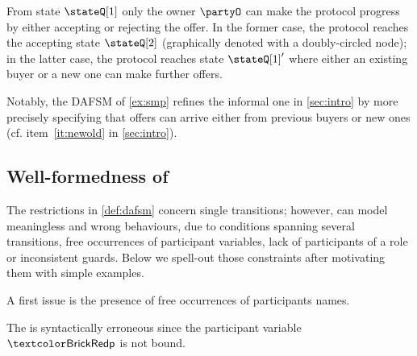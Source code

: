 \begin{example}
  From state $\stateQ[1]$ only the owner $\partyO$ can make the protocol progress by either accepting or rejecting the offer.
  In the former case, the protocol reaches the accepting state
  $\stateQ[2]$ (graphically denoted with a doubly-circled node); in
  the latter case, the protocol reaches state $\stateQ[1]'$ where
  either an existing buyer or a new one can make further offers.
  \finex
\end{example}
Notably, the DAFSM of \cref{ex:smp} refines the informal one in
\cref{sec:intro} by more precisely specifying that offers can arrive either from previous buyers or new ones (cf. item~\ref{it:newold} in \cref{sec:intro}).

\subsection{Well-formedness of \modelname}
The restrictions in \cref{def:dafsm} concern single transitions;
however, \modelnames can model meaningless and wrong behaviours, due
to conditions spanning several transitions, \eg free occurrences of
participant variables, lack of participants of a role or inconsistent
guards. Below we spell-out those constraints after motivating them
with simple examples.

\medskip
A first issue is the presence of free occurrences of participants names.
\begin{example}\label{ex:free-party}
  The \modelname {}  %
	is syntactically erroneous since the participant variable $\partyP$
	is not bound.
  \finex
\end{example}

